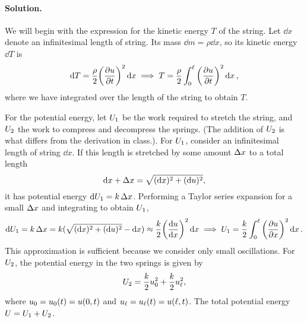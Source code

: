 \documentclass[11pt]{article}
\newenvironment{solution}
{
    \paragraph{Solution.}
    \ignorespaces
}
{
}
\begin{document}
\begin{solution}
	We will begin with the expression for the kinetic energy $T$ of the string.  Let $\dd{x}$ denote an infinitesimal length of string.  Its mass $\dd{m} = \rho \dd{x}$, so its kinetic energy $\dd{T}$ is
\begin{equation} \label{T}
	\dd{T} = \frac{\rho}{2} \bigg( \pdv{u}{t} \bigg)^2 \dd{x} \implies T = \frac{\rho}{2} \int_0^\ell \bigg( \pdv{u}{t} \bigg)^2 \dd{x},
\end{equation}
	where we have integrated over the length of the string to obtain $T$.
	
	For the potential energy, let $U_1$ be the work required to stretch the string, and $U_2$ the work to compress and decompress the springs.  (The addition of $U_2$ is what differs from the derivation in class.).  For $U_1$, consider an infinitesimal length of string $\dd{x}$.  If this length is stretched by some amount $\Delta x$ to a total length
	\begin{equation}
		\dd{x} + \Delta x = \sqrt{(\dd{x})^2 + (\dd{u})^2},
	\end{equation}
	it has potential energy $\dd{U_1} = k \,\Delta x$.  Performing a Taylor series expansion for a small $\Delta x$ and integrating to obtain $U_1$,
	\begin{equation} \label{U1}
		\dd{U_1} = k \,\Delta x = k (\sqrt{(\dd{x})^2 + (\dd{u})^2} - \dd{x}) \approx \frac{k}{2} \bigg( \dv{u}{x} \bigg)^2 \dd{x} \implies U_1 = \frac{k}{2} \int_0^\ell \bigg( \pdv{u}{x} \bigg)^2 \dd{x}.
	\end{equation}
	This approximation is sufficient because we consider only small oscillations.  For $U_2$, the potential energy in the two springs is given by
	\begin{equation} \label{U2}
		U_2 = \frac{k}{2} u_0^2 + \frac{k}{2} u_\ell^2,
	\end{equation}
	where $u_0 = u_0(t) = u(0, t)$ and $u_\ell = u_\ell(t) = u(\ell, t)$.  The total potential energy $U = U_1 + U_2$.
	

\end{solution}
\end{document}

